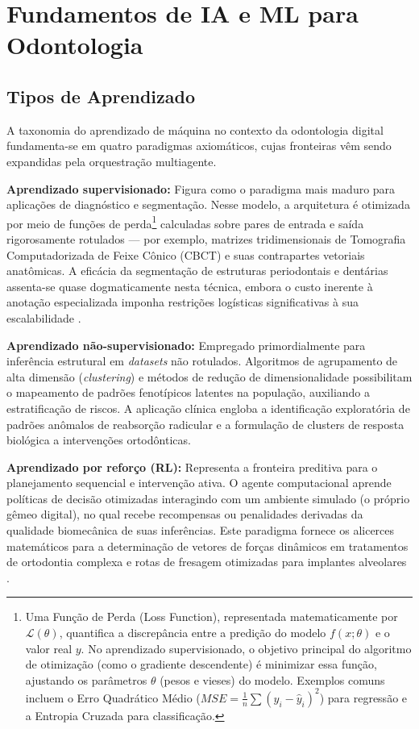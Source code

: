 \section{Fundamentos de IA e ML para Odontologia}
\label{sec:ia-fundamentos}

\subsection{Tipos de Aprendizado}

A taxonomia do aprendizado de máquina no contexto da odontologia digital fundamenta-se em quatro paradigmas axiomáticos, cujas fronteiras vêm sendo expandidas pela orquestração multiagente.

\textbf{Aprendizado supervisionado:} Figura como o paradigma mais maduro para aplicações de diagnóstico e segmentação. Nesse modelo, a arquitetura é otimizada por meio de funções de perda\footnote{Uma Função de Perda (Loss Function), representada matematicamente por $\mathcal{L}(\theta)$, quantifica a discrepância entre a predição do modelo $f(x; \theta)$ e o valor real $y$. No aprendizado supervisionado, o objetivo principal do algoritmo de otimização (como o gradiente descendente) é minimizar essa função, ajustando os parâmetros $\theta$ (pesos e vieses) do modelo. Exemplos comuns incluem o Erro Quadrático Médio ($MSE = \frac{1}{n}\sum (y_i - \hat{y}_i)^2$) para regressão e a Entropia Cruzada para classificação.} calculadas sobre pares de entrada e saída rigorosamente rotulados --- por exemplo, matrizes tridimensionais de Tomografia Computadorizada de Feixe Cônico (CBCT) e suas contrapartes vetoriais anatômicas. A eficácia da segmentação de estruturas periodontais e dentárias assenta-se quase dogmaticamente nesta técnica, embora o custo inerente à anotação especializada imponha restrições logísticas significativas à sua escalabilidade \cite{elsaid2025digital}.

\textbf{Aprendizado não-supervisionado:} Empregado primordialmente para inferência estrutural em \textit{datasets} não rotulados. Algoritmos de agrupamento de alta dimensão (\textit{clustering}) e métodos de redução de dimensionalidade possibilitam o mapeamento de padrões fenotípicos latentes na população, auxiliando a estratificação de riscos. A aplicação clínica engloba a identificação exploratória de padrões anômalos de reabsorção radicular e a formulação de clusters de resposta biológica a intervenções ortodônticas.

\textbf{Aprendizado por reforço (RL):} Representa a fronteira preditiva para o planejamento sequencial e intervenção ativa. O agente computacional aprende políticas de decisão otimizadas interagindo com um ambiente simulado (o próprio gêmeo digital), no qual recebe recompensas ou penalidades derivadas da qualidade biomecânica de suas inferências. Este paradigma fornece os alicerces matemáticos para a determinação de vetores de forças dinâmicos em tratamentos de ortodontia complexa e rotas de fresagem otimizadas para implantes alveolares \cite{zhang2024recursive}.

